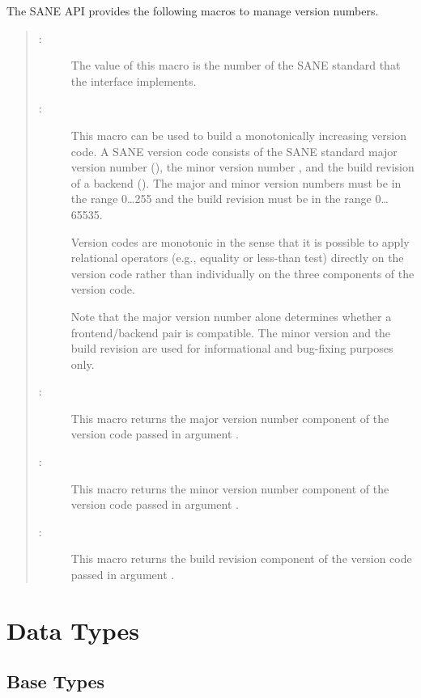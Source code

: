 \documentclass[11pt,DVIps]{report}
\begin{document}
The SANE API provides the following macros to manage version
numbers.
\begin{quote}
  \begin{description}
  \item[:] The value of this macro is the
    number of the SANE standard that the interface implements.

  \item[:]
    \label{sec:saneversioncode}
    This macro can be used to build a monotonically increasing version
    code.  A SANE version code consists of the SANE standard major
    version number (), the minor version number ,
    and the build revision of a backend ().  The major and
    minor version numbers must be in the range 0\ldots255 and the
    build revision must be in the range 0\ldots65535.

    Version codes are monotonic in the sense that it is possible to
    apply relational operators (e.g., equality or less-than test)
    directly on the version code rather than individually on the three
    components of the version code.

    Note that the major version number alone determines whether a
    frontend/backend pair is compatible.  The minor version and the
    build revision are used for informational and bug-fixing purposes
    only.
  
  \item[:] This macro returns the
    major version number component of the version code passed in
    argument .
  \item[:] This macro returns the
    minor version number component of the version code passed in
    argument .
  \item[:] This macro returns the
    build revision component of the version code passed in argument
    .
  \end{description}
\end{quote}


\section{Data Types}

\subsection{Base Types}
\end{document}
